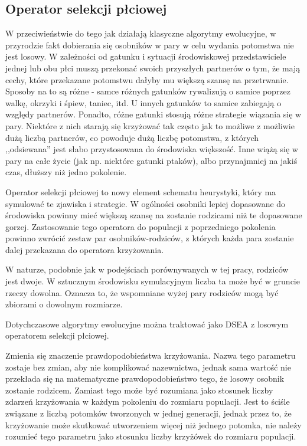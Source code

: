 \documentclass[twoside]{iisthesis}
\begin{document}
\subsection{Operator selekcji płciowej} \label{subsection:new_genSel}

W przeciwieństwie do tego jak działają klasyczne algorytmy ewolucyjne, w przyrodzie fakt dobierania się osobników w pary w celu wydania potomstwa nie jest losowy.
W zależności od gatunku i sytuacji środowiskowej przedstawiciele jednej lub obu płci muszą przekonać swoich przyszłych partnerów o tym, że mają cechy, które przekazane potomstwu dałyby mu większą szansę na przetrwanie.
Sposoby na to są różne - samce różnych gatunków rywalizują o samice poprzez walkę, okrzyki i śpiew, taniec, itd. 
U innych gatunków to samice zabiegają o względy partnerów.
Ponadto, różne gatunki stosują różne strategie wiązania się w pary.
Niektóre z nich starają się krzyżować tak często jak to możliwe z możliwie dużą liczbą partnerów, co powoduje dużą liczbę potomstwa, z których ,,odsiewana'' jest słabo przystosowana do środowiska większość.
Inne wiążą się w pary na całe życie (jak np. niektóre gatunki ptaków), albo przynajmniej na jakiś czas, dłuższy niż jedno pokolenie.

Operator selekcji płciowej to nowy element schematu heurystyki, który ma symulować te zjawiska i strategie.
W ogólności osobniki lepiej dopasowane do środowiska powinny mieć większą szansę na zostanie rodzicami niż te dopasowane gorzej.
Zastosowanie tego operatora do populacji z poprzedniego pokolenia powinno zwrócić zestaw par osobników-rodziców, z których każda para zostanie dalej przekazana do operatora krzyżowania.

W naturze, podobnie jak w podejściach porównywanych w tej pracy, rodziców jest dwoje. 
W sztucznym środowisku symulacyjnym liczba ta może być w gruncie rzeczy dowolna. 
Oznacza to, że wspomniane wyżej pary rodziców mogą być zbiorami o dowolnym rozmiarze.

Dotychczasowe algorytmy ewolucyjne można traktować jako DSEA z losowym operatorem selekcji płciowej.

Zmienia się znaczenie prawdopodobieństwa krzyżowania. 
Nazwa tego parametru zostaje bez zmian, aby nie komplikować nazewnictwa, jednak sama wartość nie przekłada się na matematyczne prawdopodobieństwo tego, że losowy osobnik zostanie rodzicem. 
Zamiast tego może być rozumiana jako stosunek liczby zdarzeń krzyżowania w każdym pokoleniu do rozmiaru populacji. 
Jest to ściśle związane z liczbą potomków tworzonych w jednej generacji, jednak przez to, że krzyżowanie może skutkować utworzeniem więcej niż jednego potomka, nie należy rozumieć tego parametru jako stosunku liczby krzyżówek do rozmiaru populacji.
\end{document}
